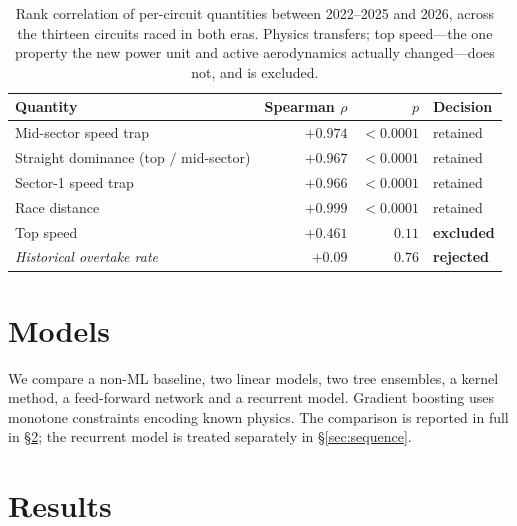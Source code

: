 \documentclass[11pt,a4paper]{article}
\begin{document}
\begin{table}[htbp]
\centering
\small
\caption{Rank correlation of per-circuit quantities between
2022--2025 and 2026, across the thirteen circuits raced in both eras.
Physics transfers; top speed---the one property the new power unit and active
aerodynamics actually changed---does not, and is excluded.}
\label{tab:physics}
\begin{tabular}{lrrl}
\toprule
Quantity & Spearman $\rho$ & $p$ & Decision \\
\midrule
Mid-sector speed trap & $+0.974$ & $<0.0001$ & retained \\
Straight dominance (top $/$ mid-sector) & $+0.967$ & $<0.0001$ & retained \\
Sector-1 speed trap & $+0.966$ & $<0.0001$ & retained \\
Race distance & $+0.999$ & $<0.0001$ & retained \\
\midrule
Top speed & $+0.461$ & $0.11$ & \textbf{excluded} \\
\midrule
\emph{Historical overtake rate} & $+0.09$ & $0.76$ & \textbf{rejected} \\
\bottomrule
\end{tabular}
\end{table}

\section{Models}

We compare a non-ML baseline, two linear models, two tree ensembles, a kernel
method, a feed-forward network and a recurrent model. Gradient boosting uses
monotone constraints encoding known physics. The comparison is reported in
full in \S\ref{sec:results}; the recurrent model is treated separately in
\S\ref{sec:sequence}.

\section{Results}
\label{sec:results}
\end{document}
